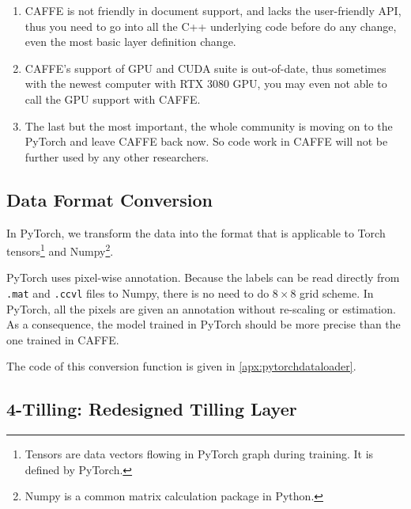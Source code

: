 \begin{spacing}{1.5}
\begin{enumerate}
    \item CAFFE is not friendly in document support, and lacks the user-friendly API, thus you need to go into all the C++ underlying code before do any change, even the most basic layer definition change. 

    \item CAFFE's support of GPU and CUDA suite is out-of-date, thus sometimes with the newest computer with RTX 3080 GPU, you may even not able to call the GPU support with CAFFE. 

    \item The last but the most important, the whole community is moving on to the PyTorch and leave CAFFE back now. So code work in CAFFE will not be further used by any other researchers.
    
\end{enumerate}

\subsection{Data Format Conversion}

In PyTorch, we transform the data into the format that is applicable to Torch tensors\footnote{Tensors are data vectors flowing in PyTorch graph during training. It is defined by PyTorch.} and Numpy\footnote{Numpy is a common matrix calculation package in Python.}. 

PyTorch uses pixel-wise annotation. Because the labels can be read directly from \texttt{.mat} and \texttt{.ccvl} files to Numpy, there is no need to do $8 \times 8$ grid scheme. In PyTorch, all the pixels are given an annotation without re-scaling or estimation. As a consequence, the model trained in PyTorch should be more precise than the one trained in CAFFE.

The code of this conversion function is given in \autoref{apx:pytorchdataloader}.

\subsection{4-Tilling: Redesigned Tilling Layer}


\end{spacing}
